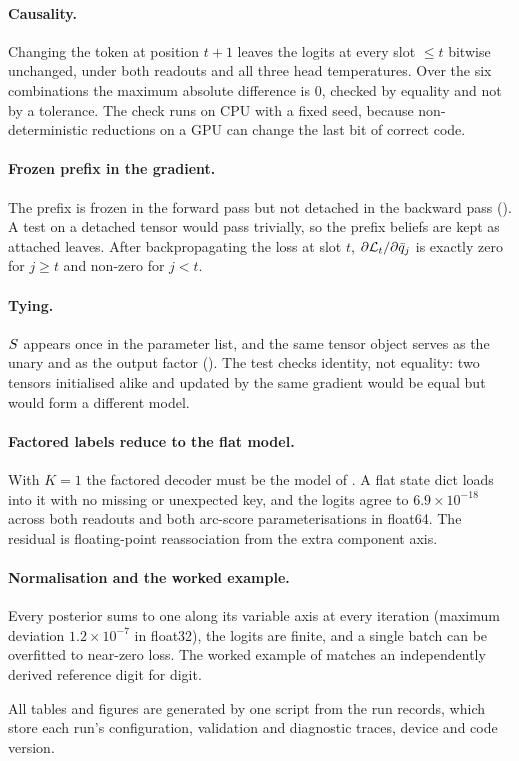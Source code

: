 \paragraph{Causality.}
Changing the token at position $t{+}1$ leaves the logits at every slot $\le t$ bitwise
unchanged, under both readouts and all three head temperatures. Over the six combinations the
maximum absolute difference is $0$, checked by equality and not by a tolerance. The check runs on
CPU with a fixed seed, because non-deterministic reductions on a GPU can change the last bit of
correct code.

\paragraph{Frozen prefix in the gradient.}
The prefix is frozen in the forward pass but not detached in the backward pass
(). A test on a detached tensor would pass trivially, so the prefix beliefs are
kept as attached leaves. After backpropagating the loss at slot $t$,
$\partial \mathcal{L}_t / \partial \bar{q}_{j}$ is exactly zero for $j \ge t$ and non-zero for
$j < t$.

\paragraph{Tying.}
$S$ appears once in the parameter list, and the same tensor object serves as the unary and
as the output factor (). The test checks identity, not equality: two tensors
initialised alike and updated by the same gradient would be equal but would form a different
model.

\paragraph{Factored labels reduce to the flat model.}
With $K=1$ the factored decoder must be the model of . A flat state dict loads
into it with no missing or unexpected key, and the logits agree to $6.9\times10^{-18}$ across
both readouts and both arc-score parameterisations in float64. The residual is floating-point
reassociation from the extra component axis.

\paragraph{Normalisation and the worked example.}
Every posterior sums to one along its variable axis at every iteration (maximum deviation
$1.2\times10^{-7}$ in float32), the logits are finite, and a single batch can be overfitted to
near-zero loss. The worked example of  matches an independently derived
reference digit for digit.

All tables and figures are generated by one script from the run records, which store each run's
configuration, validation and diagnostic traces, device and code version.
